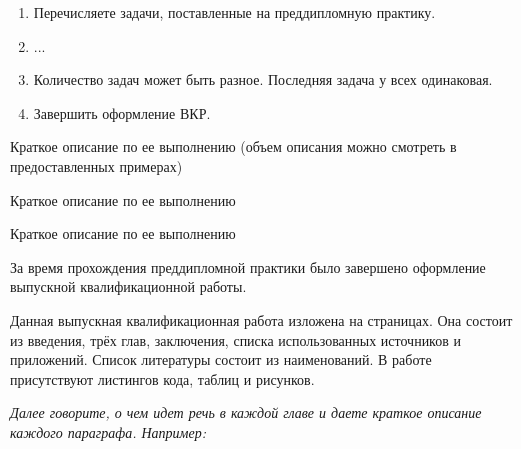\documentclass[14pt]{extarticle} %
\begin{document}
	


\newpage
\renewcommand{\baselinestretch}{1.5}
\normalsize
\nocite{*} %
	

\begin{enumerate}
	
    \item Перечисляете задачи, поставленные на преддипломную практику.
    \item ...
    \item Количество задач может быть разное. Последняя задача у всех одинаковая.
	\item Завершить оформление ВКР. 
	
\end{enumerate}
	



Краткое описание по ее выполнению (объем описания можно смотреть в предоставленных примерах)


Краткое описание по ее выполнению



Краткое описание по ее выполнению


За время прохождения преддипломной практики было завершено оформление выпускной квалификационной работы. 

Данная выпускная квалификационная работа изложена на \makebox[5mm]{\hrulefill} страницах. Она состоит из введения, трёх глав, заключения, списка использованных источников и \makebox[5mm]{\hrulefill} приложений. Список литературы состоит из \makebox[5mm]{\hrulefill} наименований. В работе присутствуют \makebox[5mm]{\hrulefill} листингов кода, \makebox[5mm]{\hrulefill} таблиц и \makebox[5mm]{\hrulefill} рисунков.

{\it Далее говорите, о чем идет речь в каждой главе и даете краткое описание каждого параграфа. Например:}
\end{document}
